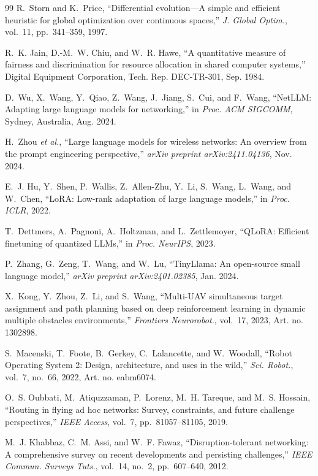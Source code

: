 \documentclass[journal]{IEEEtran}
\begin{document}
\begin{thebibliography}{99}
R.~Storn and K.~Price, ``Differential evolution---A simple and efficient heuristic for global optimization over continuous spaces,'' \textit{J. Global Optim.}, vol.~11, pp.~341--359, 1997.

R.~K. Jain, D.-M.~W. Chiu, and W.~R. Hawe, ``A quantitative measure of fairness and discrimination for resource allocation in shared computer systems,'' Digital Equipment Corporation, Tech. Rep. DEC-TR-301, Sep. 1984.

D.~Wu, X.~Wang, Y.~Qiao, Z.~Wang, J.~Jiang, S.~Cui, and F.~Wang, ``NetLLM: Adapting large language models for networking,'' in \textit{Proc. ACM SIGCOMM}, Sydney, Australia, Aug. 2024.

H.~Zhou \textit{et al.}, ``Large language models for wireless networks: An overview from the prompt engineering perspective,'' \textit{arXiv preprint arXiv:2411.04136}, Nov. 2024.

E.~J. Hu, Y.~Shen, P.~Wallis, Z.~Allen-Zhu, Y.~Li, S.~Wang, L.~Wang, and W.~Chen, ``LoRA: Low-rank adaptation of large language models,'' in \textit{Proc. ICLR}, 2022.

T.~Dettmers, A.~Pagnoni, A.~Holtzman, and L.~Zettlemoyer, ``QLoRA: Efficient finetuning of quantized LLMs,'' in \textit{Proc. NeurIPS}, 2023.

P.~Zhang, G.~Zeng, T.~Wang, and W.~Lu, ``TinyLlama: An open-source small language model,'' \textit{arXiv preprint arXiv:2401.02385}, Jan. 2024.

X.~Kong, Y.~Zhou, Z.~Li, and S.~Wang, ``Multi-UAV simultaneous target assignment and path planning based on deep reinforcement learning in dynamic multiple obstacles environments,'' \textit{Frontiers Neurorobot.}, vol.~17, 2023, Art. no. 1302898.

S.~Macenski, T.~Foote, B.~Gerkey, C.~Lalancette, and W.~Woodall, ``Robot Operating System 2: Design, architecture, and uses in the wild,'' \textit{Sci. Robot.}, vol.~7, no.~66, 2022, Art. no. eabm6074.

O.~S. Oubbati, M.~Atiquzzaman, P.~Lorenz, M.~H. Tareque, and M.~S. Hossain, ``Routing in flying ad hoc networks: Survey, constraints, and future challenge perspectives,'' \textit{IEEE Access}, vol.~7, pp.~81057--81105, 2019.

M.~J. Khabbaz, C.~M. Assi, and W.~F. Fawaz, ``Disruption-tolerant networking: A comprehensive survey on recent developments and persisting challenges,'' \textit{IEEE Commun. Surveys Tuts.}, vol.~14, no.~2, pp.~607--640, 2012.


\end{thebibliography}
\end{document}
